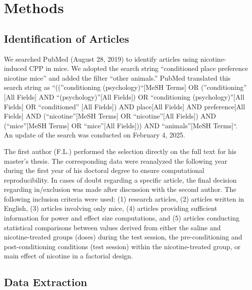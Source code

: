 \documentclass[authordate, meta]{jote-new-article}
\begin{document}
	\section{Methods}



	\subsection{Identification of Articles}



	We searched PubMed (August 28, 2019) to identify articles using nicotine-induced CPP in mice. We adopted the search string “conditioned place preference nicotine mice” and added the filter “other animals.” PubMed translated this search string as “((”conditioning (psychology)“[MeSH Terms] OR (”conditioning” [All Fields] AND “(psychology)”[All Fields]) OR “conditioning (psychology)”[All Fields] OR “conditioned” [All Fields]) AND place[All Fields] AND preference[All Fields] AND (“nicotine”[MeSH Terms] OR “nicotine”[All Fields]) AND (“mice”[MeSH Terms] OR “mice”[All Fields])) AND “animals”[MeSH Terms]“. An update of the search was conducted on February 4, 2025.



	The first author (F.L.) performed the selection directly on the full text for his master's thesis. The corresponding data were reanalyzed the following year during the first year of his doctoral degree to ensure computational reproducibility. In cases of doubt regarding a specific article, the final decision regarding in/exclusion was made after discussion with the second author. The following inclusion criteria were used: (1) research articles, (2) articles written in English, (3) articles involving only mice, (4) articles providing sufficient information for power and effect size computations, and (5) articles conducting statistical comparisons between values derived from either the saline and nicotine-treated groups (doses) during the test session, the pre-conditioning and post-conditioning conditions (test session) within the nicotine-treated group, or main effect of nicotine in a factorial design.



	\subsection{Data Extraction}
\end{document}

